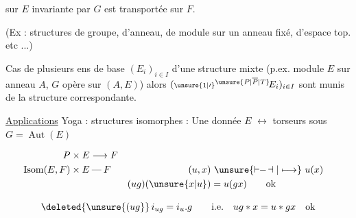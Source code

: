 sur $E$ invariante par $G$ est transportée sur $F$.

(Ex : structures de groupe, d'anneau, de module sur un anneau fixé, d'espace top. etc ...)

Cas de plusieurs ens de base $(E_i)_{i\in I}$   d'une structure mixte (p.ex. module $E$ sur anneau $A$, $G$ opère sur $(A,E)$) alors $({\scriptstyle\unsure{1|\prime}}{}^{\unsure{P|\overline P|T}}\!E_i)_{i\in I}$ sont munis de la structure correspondante.


\uline{Applications}\quad {} Yoga : structures isomorphes : Une  donnée $E$ $\longleftrightarrow$ torseurs sous $G=\operatorname{Aut}(E)$



\[
\begin{aligned}
P\times E&\longrightarrow F\\
\operatorname{Isom}(E,F)\times E&\mathbin{\text{---}} F
  & (u,x)&\ \unsure{\mathrel{\vdash\!\!-\!\dashv}|\longmapsto}\ u(x)\\
&& (ug)(\unsure{x|u})&=u(gx)\qquad\text{ok}
\end{aligned}
\]


\[
\deleted{\unsure{(ug}}\,i_{ug}=i_u.g\qquad\text{i.e.}\quad ug*x=u*gx\quad\text{ok}
\]

